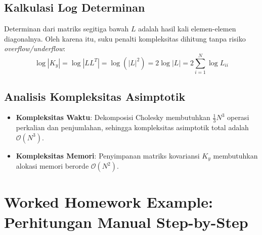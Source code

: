 \documentclass[11pt,a4paper]{article}
\begin{document}
\subsection{Kalkulasi Log Determinan}
Determinan dari matriks segitiga bawah $L$ adalah hasil kali elemen-elemen diagonalnya. Oleh karena itu, suku penalti kompleksitas dihitung tanpa risiko \textit{overflow/underflow}:
\begin{equation}
\log |K_y| = \log |L L^T| = \log (|L|^2) = 2 \log |L| = 2 \sum_{i=1}^N \log L_{ii}
\end{equation}

\subsection{Analisis Kompleksitas Asimptotik}
\begin{itemize}
    \item \textbf{Kompleksitas Waktu}: Dekomposisi Cholesky membutuhkan $\frac{1}{3} N^3$ operasi perkalian dan penjumlahan, sehingga kompleksitas asimptotik total adalah $\mathcal{O}(N^3)$.
    \item \textbf{Kompleksitas Memori}: Penyimpanan matriks kovariansi $K_y$ membutuhkan alokasi memori berorde $\mathcal{O}(N^2)$.
\end{itemize}

\section{Worked Homework Example: Perhitungan Manual Step-by-Step}
\label{sec:homework_example}
\end{document}
